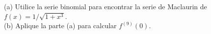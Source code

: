 \item (a) Utilice la serie binomial para encontrar la serie de Maclaurin de $f(x) = 1/\sqrt{1+x^3}$. \\
    (b) Aplique la parte (a) para calcular $f^{(9)}(0)$.
